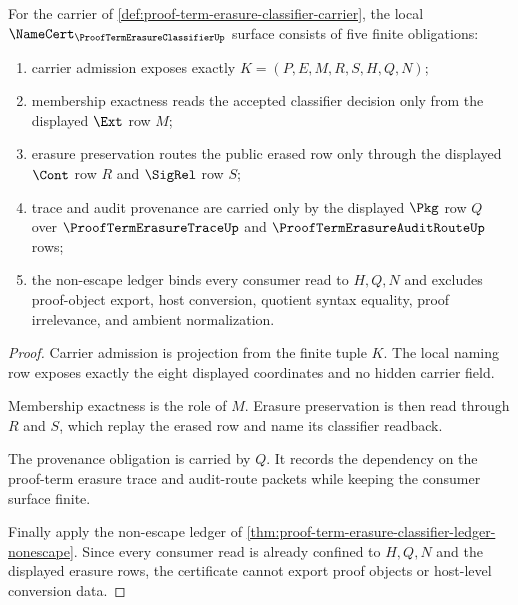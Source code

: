 \begin{theorem}
\label{thm:proof-term-erasure-classifier-namecert-obligations}
For the carrier of \autoref{def:proof-term-erasure-classifier-carrier}, the local $\NameCert_{\ProofTermErasureClassifierUp}$ surface consists of five finite obligations:
\begin{enumerate}
\item carrier admission exposes exactly $K=(P,E,M,R,S,H,Q,N)$;
\item membership exactness reads the accepted classifier decision only from the displayed $\Ext$ row $M$;
\item erasure preservation routes the public erased row only through the displayed $\Cont$ row $R$ and $\SigRel$ row $S$;
\item trace and audit provenance are carried only by the displayed $\Pkg$ row $Q$ over $\ProofTermErasureTraceUp$ and $\ProofTermErasureAuditRouteUp$ rows;
\item the non-escape ledger binds every consumer read to $H,Q,N$ and excludes proof-object export, host conversion, quotient syntax equality, proof irrelevance, and ambient normalization.
\end{enumerate}
\end{theorem}
\begin{proof}
Carrier admission is projection from the finite tuple $K$. The local naming row exposes exactly the eight displayed coordinates and no hidden carrier field.

Membership exactness is the role of $M$. Erasure preservation is then read through $R$ and $S$, which replay the erased row and name its classifier readback.

The provenance obligation is carried by $Q$. It records the dependency on the proof-term erasure trace and audit-route packets while keeping the consumer surface finite.

Finally apply the non-escape ledger of \autoref{thm:proof-term-erasure-classifier-ledger-nonescape}. Since every consumer read is already confined to $H,Q,N$ and the displayed erasure rows, the certificate cannot export proof objects or host-level conversion data.
\end{proof}


